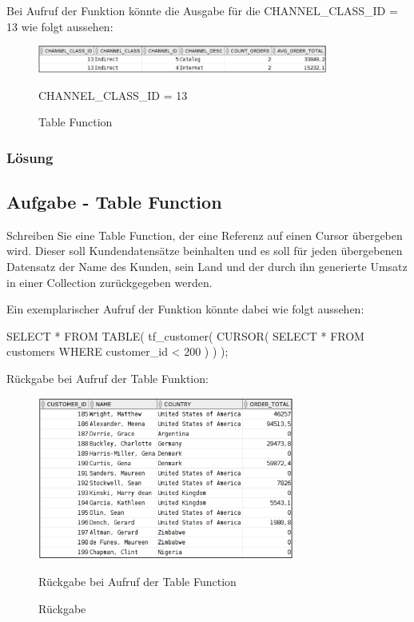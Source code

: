 Bei Aufruf der Funktion könnte die Ausgabe für die CHANNEL\_CLASS\_ID = 13 wie folgt aussehen:

\begin{figure}[H]
  \centering
  \includegraphics[width=0.85\textwidth]{img//uebung_02_-_aufgabe_02.png}
  \label{img:uebung_02_-_aufgabe_02}
  \caption{Table Function}{CHANNEL\_CLASS\_ID = 13}
\end{figure}


\subsubsection*{Lösung}
\label{sec:uebung_02.aufgabe_02.loesung}


\subsection{Aufgabe - Table Function}
\label{sec:uebung_02.aufgabe_03}
Schreiben Sie eine Table Function, der eine Referenz auf einen Cursor übergeben wird. Dieser soll Kundendatensätze beinhalten und es soll für jeden übergebenen Datensatz der Name des Kunden, sein Land und der durch ihn generierte Umsatz in einer Collection zurückgegeben werden.

Ein exemplarischer Aufruf der Funktion könnte dabei wie folgt aussehen:
\begin{sqlcode}
SELECT *
FROM TABLE(
  tf_customer(
    CURSOR(
      SELECT *
      FROM customers
      WHERE customer_id < 200
    )
  )
);
\end{sqlcode}

Rückgabe bei Aufruf der Table Funktion:
\begin{figure}[H]
  \centering
  \includegraphics[width=0.75\textwidth]{img//uebung_02_-_aufgabe_03.png}
  \label{img:uebung_02_-_aufgabe_03}
  \caption{Rückgabe}{Rückgabe bei Aufruf der Table Function}
\end{figure}

